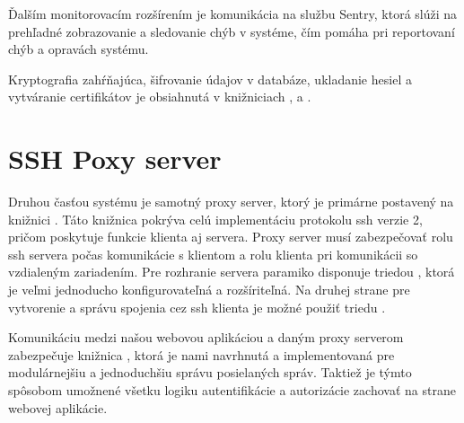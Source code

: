 Ďalším monitorovacím rozšírením je komunikácia na službu Sentry, ktorá slúži na prehľadné zobrazovanie a sledovanie chýb v
systéme, čím pomáha pri reportovaní chýb a opravách systému.

Kryptografia zahŕňajúca, šifrovanie údajov v databáze, ukladanie hesiel a vytváranie certifikátov je obsiahnutá v knižniciach
,  a .

\section{SSH Poxy server}\label{sec:ssh-proxy-server}

Druhou časťou systému je samotný proxy server, ktorý je primárne postavený na knižnici .
Táto knižnica pokrýva celú implementáciu protokolu ssh verzie 2, pričom poskytuje funkcie klienta aj servera.
Proxy server musí zabezpečovať rolu ssh servera počas komunikácie s klientom a rolu klienta pri komunikácii so vzdialeným
zariadením.
Pre rozhranie servera paramiko disponuje triedou , ktorá je veľmi jednoducho konfigurovateľná
a rozšíriteľná.
Na druhej strane pre vytvorenie a správu spojenia cez ssh klienta je možné použiť triedu .

Komunikáciu medzi našou webovou aplikáciou a daným proxy serverom zabezpečuje knižnica ,
ktorá je nami navrhnutá a implementovaná pre modulárnejšiu a jednoduchšiu správu posielaných správ.
Taktiež je týmto spôsobom umožnené všetku logiku autentifikácie a autorizácie zachovať na strane webovej aplikácie.
